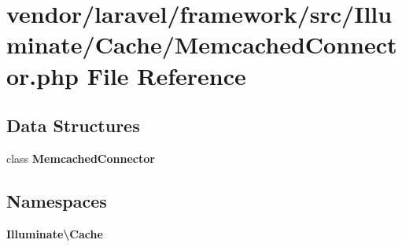 \section{vendor/laravel/framework/src/\+Illuminate/\+Cache/\+Memcached\+Connector.php File Reference}
\label{_memcached_connector_8php}
\subsection*{Data Structures}
\begin{DoxyCompactItemize}
\item 
class {\bf Memcached\+Connector}
\end{DoxyCompactItemize}
\subsection*{Namespaces}
\begin{DoxyCompactItemize}
\item 
 {\bf Illuminate\textbackslash{}\+Cache}
\end{DoxyCompactItemize}
